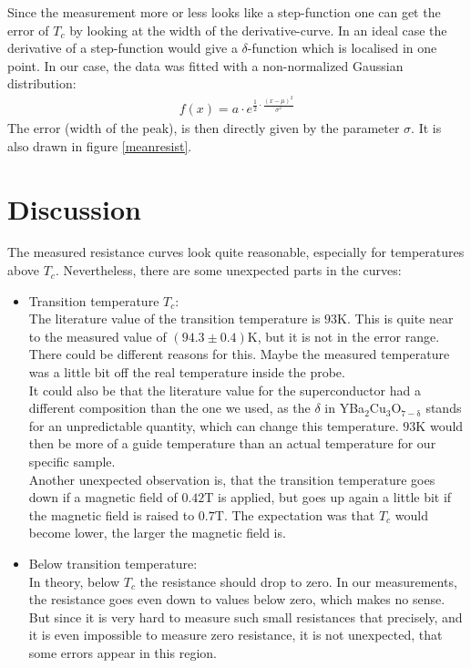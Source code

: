 \documentclass[a4paper,parskip,11pt, DIV12]{scrreprt}
\begin{document}
Since the measurement more or less looks like a step-function one can get the error of $T_{c}$ by looking at the width of the derivative-curve. In an ideal case the derivative of a step-function would give a $\delta$-function which is localised in one point. In our case, the data was fitted with a non-normalized Gaussian distribution:
\begin{align*}
f(x)= a \cdot e^{\frac{1}{2} \cdot \frac{(x-\mu)^2}{\sigma^2}}
\end{align*} 
The error (width of the peak), is then directly given by the parameter $\sigma$. It is also drawn in figure \ref{meanresist}.

\chapter{Discussion}
The measured resistance curves look quite reasonable, especially for temperatures above $T_c$. Nevertheless, there are some unexpected parts in the curves:
\begin{itemize}
\item Transition temperature $T_c$: \\
The literature value of the transition temperature is $93 \mathrm{K}$. This is quite near to the measured value of $(94.3 \pm 0.4) \mathrm{K}$, but it is not in the error range. There could be different reasons for this. Maybe the measured temperature was a little bit off the real temperature inside the probe. \\
It could also be that the literature value for the superconductor had a different composition than the one we used, as the $\delta$ in YBa$_2$Cu$_3$O$_{7-\mathrm{\delta}}$ stands for an unpredictable quantity, which can change this temperature. $93 \mathrm{K}$ would then be more of a guide temperature than an actual temperature for our specific sample.\\
Another unexpected observation is, that the transition temperature goes down if a magnetic field of $0.42 \mathrm{T}$ is applied, but goes up again a little bit if the magnetic field is raised to $0.7 \mathrm{T}$. The expectation was that $T_c$ would become lower, the larger the magnetic field is. \\
\item Below transition temperature: \\
In theory, below $T_c$ the resistance should drop to zero. In our measurements, the resistance goes even down to values below zero, which makes no sense. But since it is very hard to measure such small resistances that precisely, and it is even impossible to measure zero resistance, it is not unexpected, that some errors appear in this region. 
\end{itemize}
\end{document}
